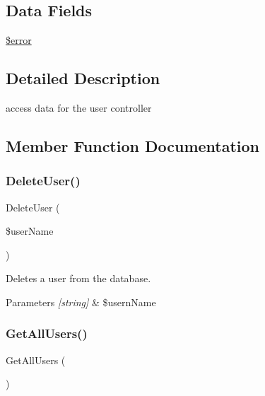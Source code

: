 \subsection*{Data Fields}
\begin{DoxyCompactItemize}
\item 
\hyperlink{class_user_d_a_o_aeba2ab722cedda53dbb7ec1a59f45550}{\$error}
\end{DoxyCompactItemize}


\subsection{Detailed Description}
access data for the user controller 

\subsection{Member Function Documentation}
\mbox{\label{class_user_d_a_o_aa755c1ae7667b1f9e424171e68239123}} 
\subsubsection{\texorpdfstring{Delete\+User()}{DeleteUser()}}
{\footnotesize\ttfamily Delete\+User (\begin{DoxyParamCaption}\item[{}]{\$user\+Name }\end{DoxyParamCaption})}



Deletes a user from the database. 


\begin{DoxyParams}{Parameters}
{\em \mbox{[}string\mbox{]}} & \$usern\+Name \\
\hline
\end{DoxyParams}
\mbox{\label{class_user_d_a_o_a1e59c6d490364d172e493358f0639112}} 
\subsubsection{\texorpdfstring{Get\+All\+Users()}{GetAllUsers()}}
{\footnotesize\ttfamily Get\+All\+Users (\begin{DoxyParamCaption}{ }\end{DoxyParamCaption})}



